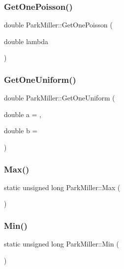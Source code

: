 \subsubsection{\texorpdfstring{Get\+One\+Poisson()}{GetOnePoisson()}}
{\footnotesize\ttfamily double Park\+Miller\+::\+Get\+One\+Poisson (\begin{DoxyParamCaption}\item[{double}]{lambda }\end{DoxyParamCaption})}

\hypertarget{classParkMiller_aec52ec51d2ae52497a7ace62d8982a8b}{}\label{classParkMiller_aec52ec51d2ae52497a7ace62d8982a8b} 
\subsubsection{\texorpdfstring{Get\+One\+Uniform()}{GetOneUniform()}}
{\footnotesize\ttfamily double Park\+Miller\+::\+Get\+One\+Uniform (\begin{DoxyParamCaption}\item[{double}]{a = {},  }\item[{double}]{b = {} }\end{DoxyParamCaption})}

\hypertarget{classParkMiller_a2bd97c9ae7113ed67aa533eb62d7097d}{}\label{classParkMiller_a2bd97c9ae7113ed67aa533eb62d7097d} 
\subsubsection{\texorpdfstring{Max()}{Max()}}
{\footnotesize\ttfamily static unsigned long Park\+Miller\+::\+Max (\begin{DoxyParamCaption}{ }\end{DoxyParamCaption})\hspace{0.3cm}{\ttfamily [static]}}

\hypertarget{classParkMiller_a6033d2fe1a8e143e673fdb53b3ee5523}{}\label{classParkMiller_a6033d2fe1a8e143e673fdb53b3ee5523} 
\subsubsection{\texorpdfstring{Min()}{Min()}}
{\footnotesize\ttfamily static unsigned long Park\+Miller\+::\+Min (\begin{DoxyParamCaption}{ }\end{DoxyParamCaption})\hspace{0.3cm}{\ttfamily [static]}}

